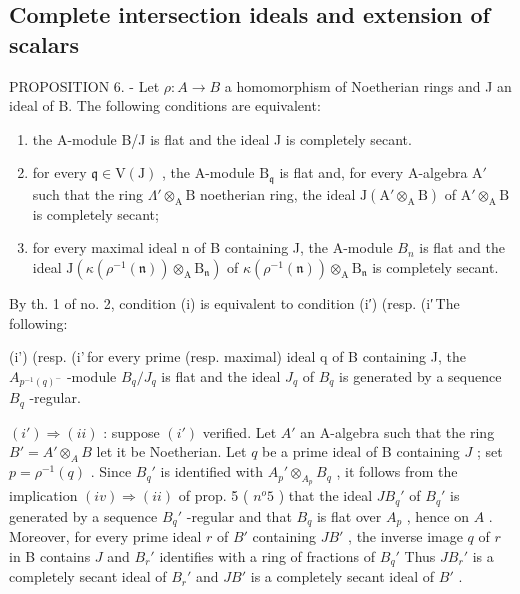 \subsection{Complete intersection ideals and extension of scalars}

PROPOSITION 6. - Let \(\rho: A \to B\) a homomorphism of Noetherian rings and J an ideal of B. The following conditions are equivalent:

\begin{enumerate}
\def\labelenumi{(\roman{enumi})}
\item
  the A-module B/J is flat and the ideal J is completely secant.
\item
  for every \(\mathfrak{q} \in \mathrm{V}(\mathrm{J})\) , the A-module \(\mathrm{B}_{\mathfrak{q}}\) is flat and, for every A-algebra \(\mathrm{A}'\) such that the ring \(\Lambda' \otimes_{\mathrm{A}} \mathrm{B}\) noetherian ring, the ideal \(\mathrm{J}(\mathrm{A}' \otimes_{\mathrm{A}} \mathrm{B})\) of \(\mathrm{A}' \otimes_{\mathrm{A}} \mathrm{B}\) is completely secant;
\item
  for every maximal ideal n of B containing J, the A-module \(B_{n}\) is flat and the ideal \(\mathrm{J}(\kappa(\rho^{-1}(\mathfrak{n}))\otimes_{\mathrm{A}}\mathrm{B}_{\mathfrak{n}})\) of \(\kappa(\rho^{-1}(\mathfrak{n}))\otimes_{\mathrm{A}}\mathrm{B}_{\mathfrak{n}}\) is completely secant.
\end{enumerate}

By th. 1 of no. 2, condition (i) is equivalent to condition (i′) (resp. (i′\,The following:

(i') (resp. (i'\,for every prime (resp. maximal) ideal q of B containing J, the \(A_{p^{-1}(q)^{-}}\) -module \(B_{q}/J_{q}\) is flat and the ideal \(J_{q}\) of \(B_{q}\) is generated by a sequence \(B_{q}\) -regular.

\((i') \Rightarrow (ii)\) : suppose \((i')\) verified. Let \(A'\) an A-algebra such that the ring \(B' = A' \otimes_A B\) let it be Noetherian. Let \(q\) be a prime ideal of B containing \(J\) ; set \(p = \rho^{-1}(q)\) . Since \(B_q'\) is identified with \(A_p' \otimes_{A_p} B_q\) , it follows from the implication \((iv) \Rightarrow (ii)\) of prop. 5 ( \(n^o 5\) ) that the ideal \(JB_q'\) of \(B_q'\) is generated by a sequence \(B_q'\) -regular and that \(B_q\) is flat over \(A_p\) , hence on \(A\) . Moreover, for every prime ideal \(r\) of \(B'\) containing \(JB'\) , the inverse image \(q\) of \(r\) in B contains \(J\) and \(B_r'\) identifies with a ring of fractions of \(B_q'\) Thus \(JB_r'\) is a completely secant ideal of \(B_r'\) and \(JB'\) is a completely secant ideal of \(B'\) .

